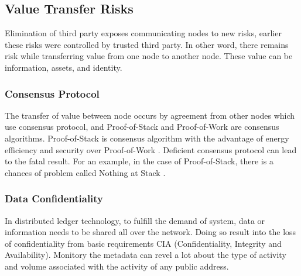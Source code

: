 \documentclass[a4paper,twoside,12pt]{report}
\begin{document}
\begin{spacing}{1.5}
\subsection{Value Transfer Risks}
Elimination of third party exposes communicating nodes to new risks, earlier these risks were controlled by trusted third party. In other word, there remains risk while transferring value from one node to another node. These value can be information, assets, and identity.
\subsubsection{Consensus Protocol}
The transfer of value between node occurs by agreement from other nodes which use consensus protocol, and
Proof-of-Stack and Proof-of-Work are consensus algorithms. Proof-of-Stack is consensus algorithm with the advantage of energy efficiency and security over Proof-of-Work \cite{saad_exploring_2019}. Deficient consensus protocol can lead to the fatal result. For an example, in the case of Proof-of-Stack, there is a chances of  problem called Nothing at Stack \cite{wiki:proofofwork}.  
\subsubsection{Data Confidentiality}
In distributed ledger technology, to fulfill the demand of system, data or information needs to be shared all over the network. Doing so result into the loss of confidentiality from basic requirements CIA (Confidentiality, Integrity and Availability). Monitory the metadata can revel a lot about the type of activity and volume associated with the activity of any public address.

\end{spacing}
\end{document}
